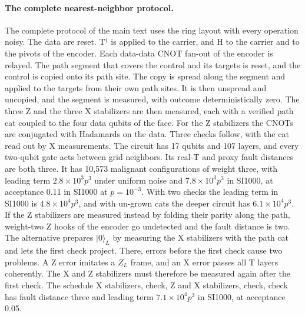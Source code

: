 \documentclass[aps,prl,reprint,twocolumn,amsmath,amssymb,floatfix,nofootinbib,superscriptaddress]{revtex4-2}
\theoremstyle{definition}
\theoremstyle{remark}
\begin{document}
\paragraph*{The complete nearest-neighbor protocol.}
The complete protocol of the main text uses the ring layout with every operation noisy. The data are reset. T$^\dagger$ is applied to the carrier, and H to the carrier and to the pivots of the encoder. Each data-data CNOT fan-out of the encoder is relayed. The path segment that covers the control and its targets is reset, and the control is copied onto its path site. The copy is spread along the segment and applied to the targets from their own path sites. It is then unspread and uncopied, and the segment is measured, with outcome deterministically zero. The three Z and the three X stabilizers are then measured, each with a verified path cat coupled to the four data qubits of the face. For the Z stabilizers the CNOTs are conjugated with Hadamards on the data. Three checks follow, with the cat read out by X measurements. The circuit has 17 qubits and 107 layers, and every two-qubit gate acts between grid neighbors. Its real-T and proxy fault distances are both three. It has 10,573 malignant configurations of weight three, with leading term $2.8\times10^3p^3$ under uniform noise and $7.8\times10^3p^3$ in SI1000, at acceptance 0.11 in SI1000 at $p=10^{-3}$. With two checks the leading term in SI1000 is $4.8\times10^4p^3$, and with un-grown cats the deeper circuit has $6.1\times10^4p^3$. If the Z stabilizers are measured instead by folding their parity along the path, weight-two Z hooks of the encoder go undetected and the fault distance is two. The alternative prepares $|0\rangle_L$ by measuring the X stabilizers with the path cat and lets the first check project. There, errors before the first check cause two problems. A Z error imitates a $Z_L$ frame, and an X error passes all T layers coherently. The X and Z stabilizers must therefore be measured again after the first check. The schedule X stabilizers, check, Z and X stabilizers, check, check has fault distance three and leading term $7.1\times10^4p^3$ in SI1000, at acceptance 0.05.
\end{document}
